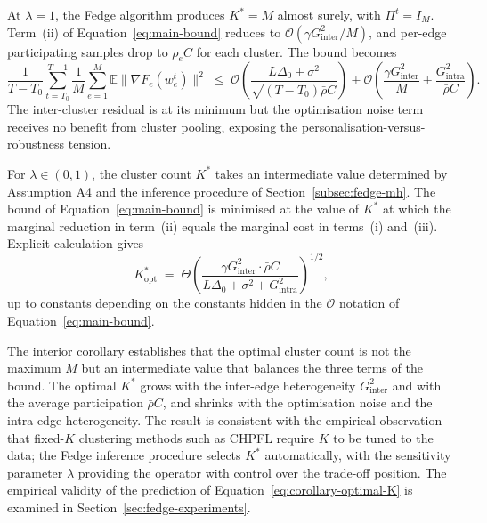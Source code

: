 \begin{corollary}[Personalisation corner, $\lambda = 1$]
\label{cor:personalisation-corner}
At $\lambda = 1$, the Fedge algorithm produces $K^{*} = M$ almost surely, with $\Pi^{t} = I_{M}$. Term~(ii) of Equation~\eqref{eq:main-bound} reduces to $\mathcal{O}(\gamma G_{\text{inter}}^{2} / M)$, and per-edge participating samples drop to $\rho_{e} C$ for each cluster. The bound becomes
\begin{equation}
\label{eq:corollary-lambda-1}
\frac{1}{T - T_{0}} \sum_{t = T_{0}}^{T-1} \frac{1}{M} \sum_{e=1}^{M} \mathbb{E} \big\| \nabla F_{e}(w_{e}^{t}) \big\|^{2} \;\leq\; \mathcal{O}\!\left( \frac{L \Delta_{0} + \sigma^{2}}{\sqrt{(T - T_{0}) \bar{\rho} C}} \right) + \mathcal{O}\!\left( \frac{\gamma G_{\text{inter}}^{2}}{M} + \frac{G_{\text{intra}}^{2}}{\bar{\rho} C} \right).
\end{equation}
The inter-cluster residual is at its minimum but the optimisation noise term receives no benefit from cluster pooling, exposing the personalisation-versus-robustness tension.
\end{corollary}

\begin{corollary}
\label{cor:interior}
For $\lambda \in (0, 1)$, the cluster count $K^{*}$ takes an intermediate value determined by Assumption A4 and the inference procedure of Section~\ref{subsec:fedge-mh}. The bound of Equation~\eqref{eq:main-bound} is minimised at the value of $K^{*}$ at which the marginal reduction in term~(ii) equals the marginal cost in terms~(i) and~(iii). Explicit calculation gives
\begin{equation}
\label{eq:corollary-optimal-K}
K^{*}_{\text{opt}} \;=\; \Theta\!\left( \frac{\gamma G_{\text{inter}}^{2} \cdot \bar{\rho} C}{L \Delta_{0} + \sigma^{2} + G_{\text{intra}}^{2}} \right)^{1/2},
\end{equation}
up to constants depending on the constants hidden in the $\mathcal{O}$ notation of Equation~\eqref{eq:main-bound}.
\end{corollary}

The interior corollary establishes that the optimal cluster count is not the maximum $M$ but an intermediate value that balances the three terms of the bound. The optimal $K^{*}$ grows with the inter-edge heterogeneity $G_{\text{inter}}^{2}$ and with the average participation $\bar{\rho} C$, and shrinks with the optimisation noise and the intra-edge heterogeneity. The result is consistent with the empirical observation that fixed-$K$ clustering methods such as CHPFL \cite{song2025chpfl} require $K$ to be tuned to the data; the Fedge inference procedure selects $K^{*}$ automatically, with the sensitivity parameter $\lambda$ providing the operator with control over the trade-off position. The empirical validity of the prediction of Equation~\eqref{eq:corollary-optimal-K} is examined in Section~\ref{sec:fedge-experiments}.


